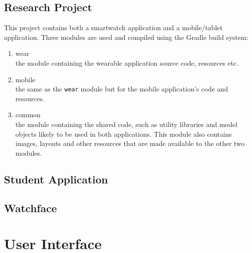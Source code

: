 \subsection{Research Project}
This project contains both a smartwatch application and a mobile/tablet
application. Three modules are used and compiled using the Gradle build system:
\begin{enumerate}
\item wear\\
the module containing the wearable application source code, resources etc.
\item mobile\\
the same as the \texttt{wear} module but for the mobile application's code and
resources.
\item common\\
the module containing the shared code, such as utility libraries and model
objects likely to be used in both applications. This module also contains
images, layouts and other resources that are made available to the other two
modules.
\end{enumerate}

\subsection{Student Application}
\subsection{Watchface}

\section{User Interface}

